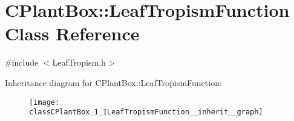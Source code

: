 \hypertarget{classCPlantBox_1_1LeafTropismFunction}{}\section{C\+Plant\+Box\+:\+:Leaf\+Tropism\+Function Class Reference}
\label{classCPlantBox_1_1LeafTropismFunction}


{\ttfamily \#include $<$Leaf\+Tropism.\+h$>$}



Inheritance diagram for C\+Plant\+Box\+:\+:Leaf\+Tropism\+Function\+:\nopagebreak
\begin{figure}[H]
\begin{center}
\leavevmode
\texttt{[image: classCPlantBox\_1\_1LeafTropismFunction\_\_inherit\_\_graph]}
\end{center}
\end{figure}
